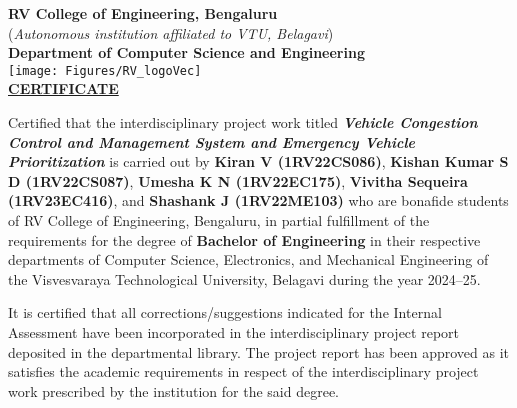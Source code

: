 \begin{titlepage}
    
    \thispagestyle{empty}
    \vspace{-1.5cm}
    
    \begin{center}
      \Large\textbf{RV College of Engineering\textsuperscript{\small\textregistered}, Bengaluru} \\[-0.5em]
      \large{(\textit{Autonomous institution affiliated to VTU, Belagavi})} \\[0.5em]
      \large\textbf{Department of Computer Science and Engineering} \\[0.5cm]
      \texttt{[image: Figures/RV\_logoVec]} \\[1cm]
      {\Large\textbf{\underline{CERTIFICATE}}}
    \end{center}
    
    \vspace{1.5em}
    \begin{spacing}{1.5}
    \noindent Certified that the interdisciplinary project work titled \textbf{\textit{Vehicle Congestion Control and Management System and Emergency Vehicle Prioritization}} is carried out by \textbf{Kiran V (1RV22CS086)}, \textbf{Kishan Kumar S D (1RV22CS087)}, \textbf{Umesha K N (1RV22EC175)}, \textbf{Vivitha Sequeira (1RV23EC416)}, and \textbf{Shashank J (1RV22ME103)} who are bonafide students of RV College of Engineering, Bengaluru, in partial fulfillment of the requirements for the degree of \textbf{Bachelor of Engineering} in their respective departments of Computer Science, Electronics, and Mechanical Engineering of the Visvesvaraya Technological University, Belagavi during the year 2024–25.
    
    It is certified that all corrections/suggestions indicated for the Internal Assessment have been incorporated in the interdisciplinary project report deposited in the departmental library. The project report has been approved as it satisfies the academic requirements in respect of the interdisciplinary project work prescribed by the institution for the said degree.
    \end{spacing}
    

\end{titlepage}
